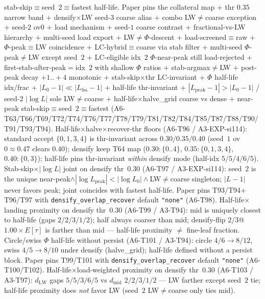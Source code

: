 \documentclass[11pt]{article}
\begin{document}
stab-skip$\equiv$seed~$2$$\equiv$fastest half-life. Paper pins the
collateral map $+$ thr $0.35$ narrow band $+$ densify$\times$LW seed-$3$
coarse alias $+$ combo LW$\neq$coarse exception $+$ seed-$2$ ov$0$ $+$
load mechanism $+$ seed-$1$ coarse contrast $+$ fractional-vs-LW hierarchy
$+$ multi-seed load export $+$ LW$\neq\Phi$-descent $+$
load-screened$\equiv$raw $+$ $\Phi$-peak$\equiv$LW coincidence $+$
LC-hybrid$\equiv$coarse via stab filter $+$ multi-seed $\Phi$-peak$\neq$LW
except seed~$2$ $+$ LC-eligible idx~$2$ $\Phi$-near-peak still
load-rejected $+$ first-stab-after-peak${=}$idx~$2$ with shallow $\Phi$
ratios $+$ stab-argmax$\neq$LW $+$ post-peak decay ${+}1..{+}4$ monotonic $+$
stab-skip$\times$thr LC-invariant $+$ $\Phi$ half-life idx/frac $+$
$|L_0{-}1|\ll|L_{\mathrm{fsa}}{-}1|$ $+$ half-life thr-invariant $+$
$|L_{\mathrm{peak}}{-}1|>|L_0{-}1|$ / seed-$2$ $|\log L|$ sole LW$\neq$coarse
$+$ half-life$\times$halve\_grid coarse vs dense $+$
near-peak stab-skip$\equiv$seed~$2$$\equiv$fastest
(A6-T63/T66/T69/T72/T74/T76/T77/T78/T79/T81/T82/T84/T85/T87/T88/T90/T91/T93/T94).
Half-life$\times$halve$\times$recover-thr floors (A6-T96 / A3-EXP-si114):
standard accept $\{0,1,3,4\}$ is thr-invariant across
$0.30/0.35/0.40$ (seed~$1$ ov$0\approx 0.47$ clears $0.40$);
densify keep T64 map ($0.30{:}\{0..4\}$, $0.35{:}\{0,1,3,4\}$,
$0.40{:}\{0,3\}$); half-life pins thr-invariant \emph{within} densify
mode (half-idx $5/5/4/6/5$). Stab-skip$\times|\log L|$ joint on densify
thr~$0.30$ (A6-T97 / A3-EXP-si114): seed~$2$ is the unique
near-peak$\wedge|\log L_{\mathrm{peak}}|<|\log L_0|\wedge$LW$\neq$coarse
singleton; $|L{-}1|$ never favors peak; joint coincides with fastest
half-life. Paper pins T93/T94$+$T96/T97 with
\texttt{densify\_overlap\_recover} default \texttt{"none"} (A6-T98).
Half-life$\times$landing proximity on densify thr~$0.30$ (A6-T99 / A3-T94):
mid is uniquely closest to half-life (gaps $2/2/3/1/2$);
half always coarser than mid; densify-flip $2/3$@$1.00\times E[\tau]$ is
farther than mid --- half-life proximity $\neq$ fine-leaf fraction.
Circle/swiss $\Phi$ half-life without persist (A6-T101 / A3-T94):
circle $4/6\to 8/12$, swiss $4/5\to 8/10$ under densify (halve\_grid);
half-life defined without a persist block. Paper pins T99/T101 with
\texttt{densify\_overlap\_recover} default \texttt{"none"} (A6-T100/T102).
Half-life$\times$load-weighted proximity on densify thr~$0.30$
(A6-T103 / A3-T97): $d_{\mathrm{LW}}$ gaps $5/5/3/6/5$ vs $d_{\mathrm{mid}}$
$2/2/3/1/2$ --- LW farther except seed~$2$ tie; half-life proximity does
\emph{not} favor LW (seed~$2$ LW$\neq$coarse only ties mid).
\end{document}
